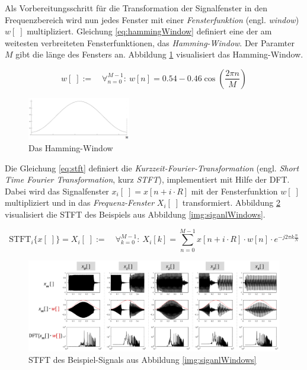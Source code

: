 Als Vorbereitungsschritt für die Transformation der Signalfenster in den Frequenzbereich wird nun jedes Fenster mit einer \emph{Fensterfunktion} (engl. \emph{window}) $w[\;]$ multipliziert.\cite[S. 69]{sprachverarbeitung} Gleichung \ref{eq:hammingWindow} definiert eine der am weitesten verbreiteten Fensterfunktionen, das \emph{Hamming-Window}. Der Paramter $M$ gibt die länge des Fensters an. Abbildung \ref{img:hamming} visualisiert das Hamming-Window. \cite[S. 286]{dspGuide}

\begin{equation}
w[\;] := \quad \mathop{\forall}_{n = 0}^{M-1} :\ w[n] = 0.54 - 0.46 \cos(\frac{2\pi n}{M} )
\label{eq:hammingWindow}
\end{equation}

\begin{figure}[h]
	\centering
	\includegraphics[width=0.4\textwidth]{bilder/hamming01.png}
	\caption{Das Hamming-Window}
	\label{img:hamming}
\end{figure}

Die Gleichung \ref{eq:stft} definiert die \emph{Kurzzeit-Fourier-Transformation} (engl. \emph{Short Time Fourier Transformation}, kurz \emph{STFT}), implementiert mit Hilfe der DFT. Dabei wird das Signalfenster $x_i[\;] = x[n+i\cdot R]$ mit der Fensterfunktion $w[\;]$ multipliziert und in das \emph{Frequenz-Fenster} $X_i[\;]$ transformiert.\cite[S. 69]{sprachverarbeitung} \cite{stft} Abbildung \ref{img:stft02} visualisiert die STFT des Beispiels aus Abbildung \ref{img:siganlWindows}.

\begin{equation}
\text{STFT}_i\{x[\;]\} = X_i[\;] := \quad \mathop{\forall}_{k = 0}^{M-1} :\ X_i[k] = \sum_{n=0}^{M-1} x[n+i\cdot R] \cdot w[n] \cdot e^{-j 2\pi k \frac{n}{N}}
\label{eq:stft}
\end{equation}

\begin{figure}[h]
	\centering
	\includegraphics[width=1\textwidth]{bilder/stft03.png}
	\caption{STFT des Beispiel-Signals aus Abbildung \ref{img:siganlWindows}}
	\label{img:stft02}
\end{figure}



